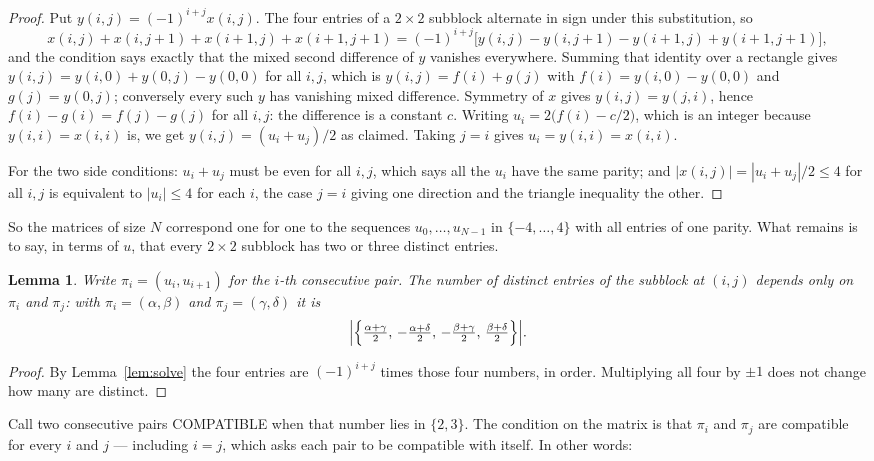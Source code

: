 \documentclass[11pt,a4paper]{article}
\theoremstyle{plain}
\newtheorem{lemma}[theorem]{Lemma}
\theoremstyle{definition}
\begin{document}
\begin{proof}
Put $y(i,j)=(-1)^{i+j}x(i,j)$. The four entries of a $2\times2$ subblock alternate in sign
under this substitution, so
\[
x(i,j)+x(i,j{+}1)+x(i{+}1,j)+x(i{+}1,j{+}1)
=(-1)^{i+j}\bigl[y(i,j)-y(i,j{+}1)-y(i{+}1,j)+y(i{+}1,j{+}1)\bigr],
\]
and the condition says exactly that the mixed second difference of $y$ vanishes everywhere.
Summing that identity over a rectangle gives
$y(i,j)=y(i,0)+y(0,j)-y(0,0)$ for all $i,j$, which is $y(i,j)=f(i)+g(j)$ with
$f(i)=y(i,0)-y(0,0)$ and $g(j)=y(0,j)$; conversely every such $y$ has vanishing mixed
difference. Symmetry of $x$ gives $y(i,j)=y(j,i)$, hence $f(i)-g(i)=f(j)-g(j)$ for all $i,j$:
the difference is a constant $c$. Writing $u_i=2\bigl(f(i)-c/2\bigr)$, which is an integer
because $y(i,i)=x(i,i)$ is, we get $y(i,j)=(u_i+u_j)/2$ as claimed. Taking $j=i$ gives
$u_i=y(i,i)=x(i,i)$.

For the two side conditions: $u_i+u_j$ must be even for all $i,j$, which says all the $u_i$ have
the same parity; and $|x(i,j)|=|u_i+u_j|/2\le4$ for all $i,j$ is equivalent to $|u_i|\le4$
for each $i$, the case $j=i$ giving one direction and the triangle inequality the other.
\end{proof}

So the matrices of size $N$ correspond one for one to the sequences $u_0,\dots,u_{N-1}$ in
$\{-4,\dots,4\}$ with all entries of one parity. What remains is to say, in terms of $u$,
that every $2\times2$ subblock has two or three distinct entries.

\begin{lemma}\label{lem:block}
Write $\pi_i=(u_i,u_{i+1})$ for the $i$-th consecutive pair. The number of distinct entries of
the subblock at $(i,j)$ depends only on $\pi_i$ and $\pi_j$: with $\pi_i=(\alpha,\beta)$ and
$\pi_j=(\gamma,\delta)$ it is
\[
\Bigl|\Bigl\{\tfrac{\alpha+\gamma}{2},\,-\tfrac{\alpha+\delta}{2},\,
-\tfrac{\beta+\gamma}{2},\,\tfrac{\beta+\delta}{2}\Bigr\}\Bigr| .
\]
\end{lemma}

\begin{proof}
By Lemma~\ref{lem:solve} the four entries are $(-1)^{i+j}$ times those four numbers, in
order. Multiplying all four by $\pm1$ does not change how many are distinct.
\end{proof}

Call two consecutive pairs COMPATIBLE when that number lies in $\{2,3\}$. The condition on the
matrix is that $\pi_i$ and $\pi_j$ are compatible for every $i$ and $j$ --- including $i=j$,
which asks each pair to be compatible with itself. In other words:
\end{document}
